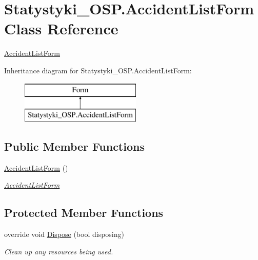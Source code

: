 \hypertarget{class_statystyki___o_s_p_1_1_accident_list_form}{}\section{Statystyki\+\_\+\+O\+S\+P.\+Accident\+List\+Form Class Reference}
\label{class_statystyki___o_s_p_1_1_accident_list_form}


\mbox{\hyperlink{class_statystyki___o_s_p_1_1_accident_list_form}{Accident\+List\+Form}}  


Inheritance diagram for Statystyki\+\_\+\+O\+S\+P.\+Accident\+List\+Form\+:\begin{figure}[H]
\begin{center}
\leavevmode
\includegraphics[height=2.000000cm]{class_statystyki___o_s_p_1_1_accident_list_form}
\end{center}
\end{figure}
\subsection*{Public Member Functions}
\begin{DoxyCompactItemize}
\item 
\mbox{\hyperlink{class_statystyki___o_s_p_1_1_accident_list_form_a8b9af2519ba1a5ffde154f51468f38e0}{Accident\+List\+Form}} ()
\begin{DoxyCompactList}\small\item\em \mbox{\hyperlink{class_statystyki___o_s_p_1_1_accident_list_form}{Accident\+List\+Form}} \end{DoxyCompactList}\end{DoxyCompactItemize}
\subsection*{Protected Member Functions}
\begin{DoxyCompactItemize}
\item 
override void \mbox{\hyperlink{class_statystyki___o_s_p_1_1_accident_list_form_a773c2b928ab147d1209dbb0a92ba5d8b}{Dispose}} (bool disposing)
\begin{DoxyCompactList}\small\item\em Clean up any resources being used. \end{DoxyCompactList}\end{DoxyCompactItemize}
